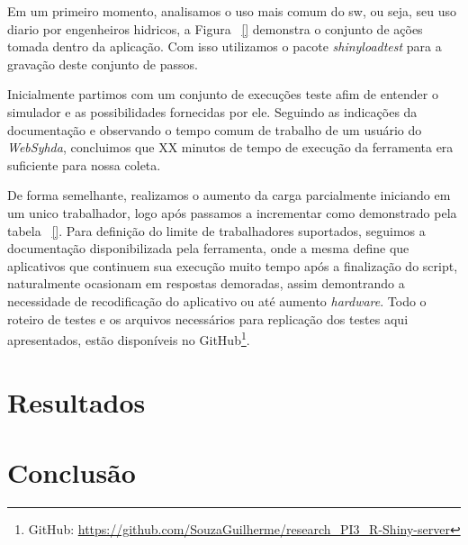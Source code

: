 \documentclass[12pt,english,brazil]{article}
\begin{document}
Em um primeiro momento, analisamos o uso mais comum do sw, ou seja, seu uso diario por engenheiros hidricos, a Figura ~\ref{} demonstra o conjunto de ações tomada dentro da aplicação. Com isso utilizamos o pacote \emph{shinyloadtest} para a gravação deste conjunto de passos. 

Inicialmente partimos com um conjunto de execuções teste afim de entender o simulador e as possibilidades fornecidas por ele. Seguindo as indicações da documentação e observando o tempo comum de trabalho de um usuário do \emph{WebSyhda}, concluimos que %
XX minutos de tempo de execução da ferramenta era suficiente para nossa coleta.



De forma semelhante, realizamos o aumento da carga parcialmente iniciando em um unico trabalhador, logo após passamos a incrementar como demonstrado pela tabela ~\ref{}. Para definição do limite de trabalhadores suportados, seguimos a documentação disponibilizada pela ferramenta, onde a mesma define que aplicativos que continuem sua execução muito tempo após a finalização do script, naturalmente ocasionam em respostas demoradas, assim demontrando a necessidade de recodificação do aplicativo ou até aumento \emph{hardware}. Todo o roteiro de testes e os arquivos necessários para replicação dos testes aqui apresentados, estão disponíveis no GitHub\footnote{GitHub: \url{https://github.com/SouzaGuilherme/research_PI3_R-Shiny-server}}.

\section{Resultados} \label{sec:Resultados}


\section{Conclusão} \label{sec:conlusao}





\end{document}
